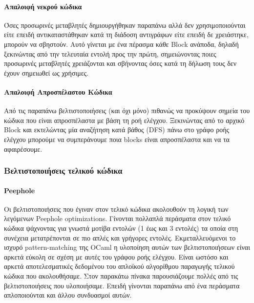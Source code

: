\documentclass[12pt]{article}
\begin{document}
\paragraph{Απαλοιφή νεκρού κώδικα}
Όσες προσωρινές μεταβλητές δημιουργήθηκαν παραπάνω αλλά δεν χρησιμοποιούνται είτε επειδή αντικαταστάθηκαν κατά τη διάδοση αντιγράφων είτε επειδή δε χρειάστηκε, μπορούν να σβηστούν. Αυτό γίνεται με ένα πέρασμα κάθε Block ανάποδα, δηλαδή ξεκινώντας από την τελευταία εντολή προς την πρώτη, σημειώνοντας ποιες προσωρινές μεταβλητές χρειάζονται και σβήνοντας όσες κατά τη δήλωση τους δεν έχουν σημειωθεί ως χρήσιμες.
\paragraph{Απαλοιφή Απροσπέλαστου Κώδικα}
Από τις παραπάνω βελτιστοποιήσεις (και όχι μόνο) πιθανώς να προκύψουν σημεία του κώδικα που είναι απροσπέλαστα με βάση τη ροή ελέγχου. Ξεκινώντας από το αρχικό Block και εκτελώντας μία αναζήτηση κατά βάθος (DFS) πάνω στο γράφο ροής ελέγχου μπορούμε να συμπεράνουμε ποια blocks είναι απροσπέλαστα και να τα αφαιρέσουμε.
\subsubsection{Βελτιστοποιήσεις τελικού κώδικα}
\paragraph{Peephole} Οι βελτιστοποιήσεις που έγιναν στον τελικό κώδικα ακολουθούν τη λογική των λεγόμενων Peephole optimizations. Γίνονται πολλαπλά περάσματα στον τελικό κώδικα ψάχνοντας για γνωστά μοτίβα εντολών (1 έως και 3 εντολές) τα οποία στη συνέχεια μετατρέπονται σε πιο απλές και γρήγορες εντολές. Εκμεταλλευόμενοι το ισχυρό pattern-matching της OCaml η υλοποίηση αυτών των βελτιστοποιήσεων είναι αρκετά εύκολη σε σχέση με αυτές του γράφου ροής ελέγχου. Είναι ωστόσο και αρκετά αποτελεσματικές δεδομένου του απλοϊκού αλγορίθμου παραγωγής τελικού κώδικα που ακολουθήσαμε. Στον παρακάτω πίνακα παρουσιάζουμε πολλές από τις βελτιστοποιήσεις που υλοποιήσαμε. Επειδή γίνονται παραπάνω από ένα περάσματα απλοποιούνται και άλλου συνδυασμοί αυτών.
\end{document}
